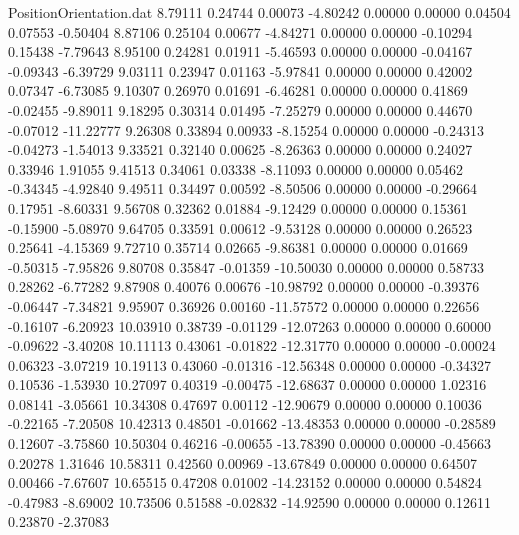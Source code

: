 \begin{filecontents}{PositionOrientation.dat}
   8.79111    0.24744    0.00073    -4.80242    0.00000    0.00000    0.04504    0.07553   -0.50404
   8.87106    0.25104    0.00677    -4.84271    0.00000    0.00000   -0.10294    0.15438   -7.79643
   8.95100    0.24281    0.01911    -5.46593    0.00000    0.00000   -0.04167   -0.09343   -6.39729
   9.03111    0.23947    0.01163    -5.97841    0.00000    0.00000    0.42002    0.07347   -6.73085
   9.10307    0.26970    0.01691    -6.46281    0.00000    0.00000    0.41869   -0.02455   -9.89011
   9.18295    0.30314    0.01495    -7.25279    0.00000    0.00000    0.44670   -0.07012  -11.22777
   9.26308    0.33894    0.00933    -8.15254    0.00000    0.00000   -0.24313   -0.04273   -1.54013
   9.33521    0.32140    0.00625    -8.26363    0.00000    0.00000    0.24027    0.33946    1.91055
   9.41513    0.34061    0.03338    -8.11093    0.00000    0.00000    0.05462   -0.34345   -4.92840
   9.49511    0.34497    0.00592    -8.50506    0.00000    0.00000   -0.29664    0.17951   -8.60331
   9.56708    0.32362    0.01884    -9.12429    0.00000    0.00000    0.15361   -0.15900   -5.08970
   9.64705    0.33591    0.00612    -9.53128    0.00000    0.00000    0.26523    0.25641   -4.15369
   9.72710    0.35714    0.02665    -9.86381    0.00000    0.00000    0.01669   -0.50315   -7.95826
   9.80708    0.35847   -0.01359   -10.50030    0.00000    0.00000    0.58733    0.28262   -6.77282
   9.87908    0.40076    0.00676   -10.98792    0.00000    0.00000   -0.39376   -0.06447   -7.34821
   9.95907    0.36926    0.00160   -11.57572    0.00000    0.00000    0.22656   -0.16107   -6.20923
  10.03910    0.38739   -0.01129   -12.07263    0.00000    0.00000    0.60000   -0.09622   -3.40208
  10.11113    0.43061   -0.01822   -12.31770    0.00000    0.00000   -0.00024    0.06323   -3.07219
  10.19113    0.43060   -0.01316   -12.56348    0.00000    0.00000   -0.34327    0.10536   -1.53930
  10.27097    0.40319   -0.00475   -12.68637    0.00000    0.00000    1.02316    0.08141   -3.05661
  10.34308    0.47697    0.00112   -12.90679    0.00000    0.00000    0.10036   -0.22165   -7.20508
  10.42313    0.48501   -0.01662   -13.48353    0.00000    0.00000   -0.28589    0.12607   -3.75860
  10.50304    0.46216   -0.00655   -13.78390    0.00000    0.00000   -0.45663    0.20278    1.31646
  10.58311    0.42560    0.00969   -13.67849    0.00000    0.00000    0.64507    0.00466   -7.67607
  10.65515    0.47208    0.01002   -14.23152    0.00000    0.00000    0.54824   -0.47983   -8.69002
  10.73506    0.51588   -0.02832   -14.92590    0.00000    0.00000    0.12611    0.23870   -2.37083

\end{filecontents}
